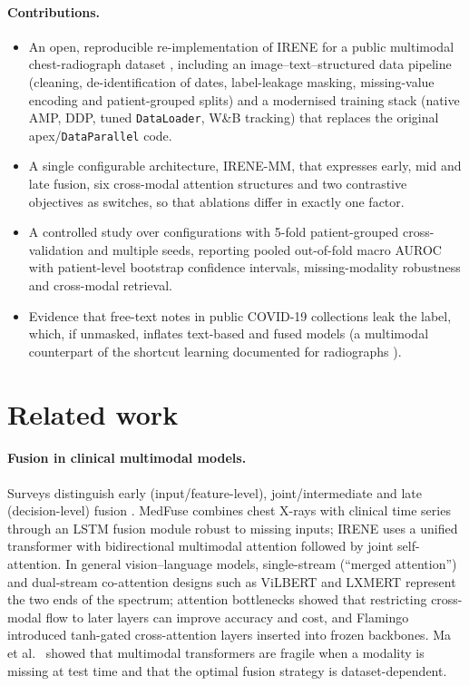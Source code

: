 \paragraph{Contributions.}
\begin{itemize}
\item An open, reproducible re-implementation of IRENE for a public multimodal chest-radiograph
dataset \citep{cohen2020covid}, including an image--text--structured data pipeline
(cleaning, de-identification of dates, label-leakage masking, missing-value encoding and
patient-grouped splits) and a modernised training stack (native AMP, DDP, tuned
\texttt{DataLoader}, W\&B tracking) that replaces the original apex/\texttt{DataParallel} code.
\item A single configurable architecture, IRENE-MM, that expresses early, mid and late fusion,
six cross-modal attention structures and two contrastive objectives as switches, so that
ablations differ in exactly one factor.
\item A controlled study over \NRuns{} configurations with 5-fold patient-grouped cross-validation
and multiple seeds, reporting pooled out-of-fold macro AUROC with patient-level bootstrap
confidence intervals, missing-modality robustness and cross-modal retrieval.
\item Evidence that free-text notes in public COVID-19 collections leak the label, which, if
unmasked, inflates text-based and fused models (a multimodal counterpart of the shortcut
learning documented for radiographs \citep{degrave2021shortcuts,roberts2021pitfalls}).
\end{itemize}

\section{Related work}
\paragraph{Fusion in clinical multimodal models.}
Surveys distinguish early (input/feature-level), joint/intermediate and late (decision-level)
fusion \citep{huang2020fusion,acosta2022multimodal}. MedFuse \citep{hayat2022medfuse} combines
chest X-rays with clinical time series through an LSTM fusion module robust to missing inputs;
IRENE \citep{zhou2023irene} uses a unified transformer with bidirectional multimodal attention
followed by joint self-attention. In general vision--language models, single-stream
(``merged attention'') and dual-stream co-attention designs such as ViLBERT and LXMERT
\citep{lu2019vilbert,tan2019lxmert} represent the two ends of the spectrum; attention
bottlenecks \citep{nagrani2021bottleneck} showed that restricting cross-modal flow to later
layers can improve accuracy and cost, and Flamingo \citep{alayrac2022flamingo} introduced
tanh-gated cross-attention layers inserted into frozen backbones. Ma et al.\ \citep{ma2022missing}
showed that multimodal transformers are fragile when a modality is missing at test time and that
the optimal fusion strategy is dataset-dependent.

